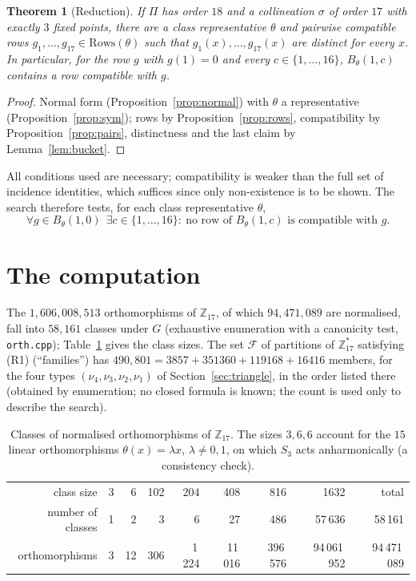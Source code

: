 \documentclass[11pt,a4paper]{article}
\newtheorem{theorem}{Theorem}[section]
\theoremstyle{definition}
\newcommand{\ZZ}{\mathbb{Z}}
\newcommand{\Zs}{\mathbb{Z}_{17}^{*}}
\newcommand{\Rows}{\mathrm{Rows}}
\begin{document}
\begin{theorem}[Reduction]\label{thm:reduction}
If $\Pi$ has order $18$ and a collineation $\sigma$ of order $17$ with exactly $3$ fixed points, there are a class representative $\theta$ and pairwise compatible rows $g_1,\dots,g_{17}\in\Rows(\theta)$ such that $g_1(x),\dots,g_{17}(x)$ are distinct for every $x$. In particular, for the row $g$ with $g(1)=0$ and every $c\in\{1,\dots,16\}$, $B_\theta(1,c)$ contains a row compatible with $g$.
\end{theorem}
\begin{proof}
Normal form (Proposition~\ref{prop:normal}) with $\theta$ a representative (Proposition~\ref{prop:sym}); rows by Proposition~\ref{prop:rows}, compatibility by Proposition~\ref{prop:pairs}, distinctness and the last claim by Lemma~\ref{lem:bucket}.
\end{proof}

All conditions used are necessary; compatibility is weaker than the full set of incidence identities, which suffices since only non-existence is to be shown. The search therefore tests, for each class representative $\theta$,
\begin{equation}\tag{$\star_\theta$}
\forall g\in B_\theta(1,0)\ \ \exists c\in\{1,\dots,16\}:\ \text{no row of }B_\theta(1,c)\text{ is compatible with }g.
\end{equation}

\section{The computation}\label{sec:computation}

The $1{,}606{,}008{,}513$ orthomorphisms of $\ZZ_{17}$, of which $94{,}471{,}089$ are normalised, fall into $58{,}161$ classes under $G$ (exhaustive enumeration with a canonicity test, \texttt{orth.cpp}); Table~\ref{tab:classes} gives the class sizes. The set $\mathcal F$ of partitions of $\Zs$ satisfying (R1) (``families'') has $490{,}801=3857+351360+119168+16416$ members, for the four types $(\nu_4,\nu_3,\nu_2,\nu_1)$ of Section~\ref{sec:triangle}, in the order listed there (obtained by enumeration; no closed formula is known; the count is used only to describe the search).

\begin{table}[ht]
\centering\small
\begin{tabular}{rrrrrrrr|r}
\toprule
class size & 3 & 6 & 102 & 204 & 408 & 816 & 1632 & total\\
number of classes & 1 & 2 & 3 & 6 & 27 & 486 & 57\,636 & 58\,161\\
orthomorphisms & 3 & 12 & 306 & 1\,224 & 11\,016 & 396\,576 & 94\,061\,952 & 94\,471\,089\\
\bottomrule
\end{tabular}
\caption{Classes of normalised orthomorphisms of $\ZZ_{17}$. The sizes $3,6,6$ account for the $15$ linear orthomorphisms $\theta(x)=\lambda x$, $\lambda\ne0,1$, on which $S_3$ acts anharmonically (a consistency check).}\label{tab:classes}
\end{table}
\end{document}
